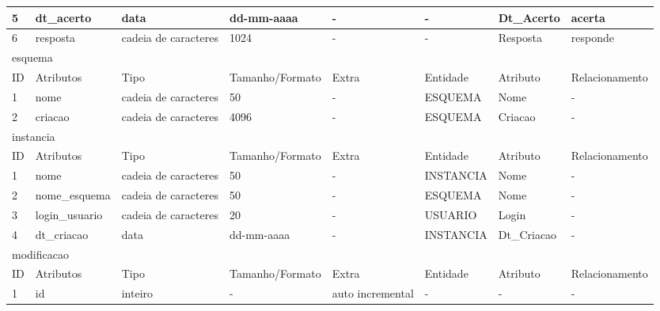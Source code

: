 \documentclass[graduacao,brazil]{ThesisPUC}
\begin{document}
\begin{table}[H]
{\begin{tabular}{|l|l|l|l|l|l|l|l|}
    5                       & dt\_acerto     & data                 & dd-mm-aaaa      & -                & -               & Dt\_Acerto     & acerta          \\ \hline
    6                       & resposta       & cadeia de caracteres & 1024            & -                & -               & Resposta       & responde        \\ \hline
    \multicolumn{8}{|l|}{esquema} \\ \hline
    ID                      & Atributos      & Tipo                 & Tamanho/Formato & Extra            & Entidade        & Atributo       & Relacionamento  \\ \hline
    1                       & nome           & cadeia de caracteres & 50              & -                & ESQUEMA         & Nome           & -               \\ \hline
    2                       & criacao        & cadeia de caracteres & 4096            & -                & ESQUEMA         & Criacao        & -               \\ \hline
    \multicolumn{8}{|l|}{instancia} \\ \hline
    ID                      & Atributos      & Tipo                 & Tamanho/Formato & Extra            & Entidade        & Atributo       & Relacionamento  \\ \hline
    1                       & nome           & cadeia de caracteres & 50              & -                & INSTANCIA       & Nome           & -               \\ \hline
    2                       & nome\_esquema  & cadeia de caracteres & 50              & -                & ESQUEMA         & Nome           & -               \\ \hline
    3                       & login\_usuario & cadeia de caracteres & 20              & -                & USUARIO         & Login          & -               \\ \hline
    4                       & dt\_criacao    & data                 & dd-mm-aaaa      & -                & INSTANCIA       & Dt\_Criacao    & -               \\ \hline
    \multicolumn{8}{|l|}{modificacao} \\ \hline
    ID                      & Atributos      & Tipo                 & Tamanho/Formato & Extra            & Entidade        & Atributo       & Relacionamento  \\ \hline
    1                       & id             & inteiro              & -               & auto incremental & -               & -              & -               \\ \hline

\end{tabular}}
\end{table}
\end{document}
